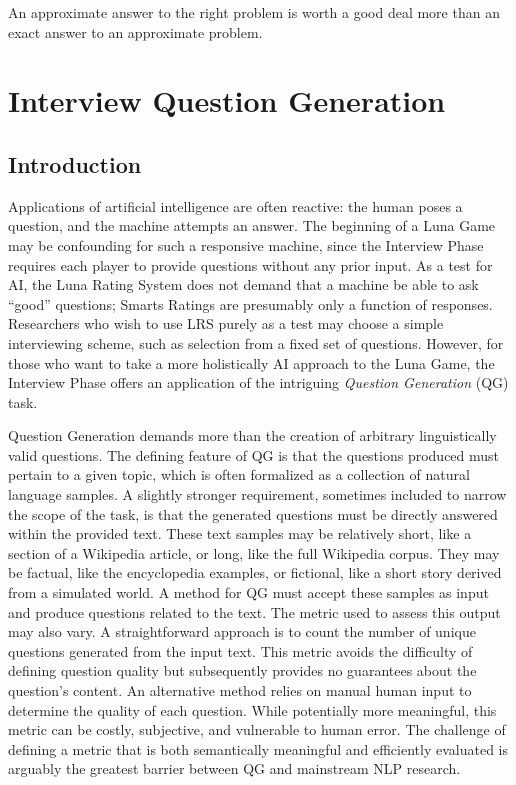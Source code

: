 \begin{savequote}[75mm]
An approximate answer to the right problem is worth a good deal more than an exact answer to an approximate problem.
\end{savequote}
\chapter{Interview Question Generation}

\section{Introduction}

Applications of artificial intelligence are often reactive: the human poses a question, and the machine attempts an answer. The beginning of a Luna Game may be confounding for such a responsive machine, since the Interview Phase requires each player to provide questions without any prior input. As a test for AI, the Luna Rating System does not demand that a machine be able to ask ``good'' questions; Smarts Ratings are presumably only a function of responses. Researchers who wish to use LRS purely as a test may choose a simple interviewing scheme, such as selection from a fixed set of questions. However, for those who want to take a more holistically AI approach to the Luna Game, the Interview Phase offers an application of the intriguing \textit{Question Generation} (QG) task.

Question Generation demands more than the creation of arbitrary linguistically valid questions. The defining feature of QG is that the questions produced must pertain to a given topic, which is often formalized as a collection of natural language samples. A slightly stronger requirement, sometimes included to narrow the scope of the task, is that the generated questions must be directly answered within the provided text. These text samples may be relatively short, like a section of a Wikipedia article, or long, like the full Wikipedia corpus. They may be factual, like the encyclopedia examples, or fictional, like a short story derived from a simulated world. A method for QG must accept these samples as input and produce questions related to the text. The metric used to assess this output may also vary. A straightforward approach is to count the number of unique questions generated from the input text. This metric avoids the difficulty of defining question quality but subsequently provides no guarantees about the question's content. An alternative method relies on manual human input to determine the quality of each question. While potentially more meaningful, this metric can be costly, subjective, and vulnerable to human error. The challenge of defining a metric that is both semantically meaningful and efficiently evaluated is arguably the greatest barrier between QG and mainstream NLP research.

